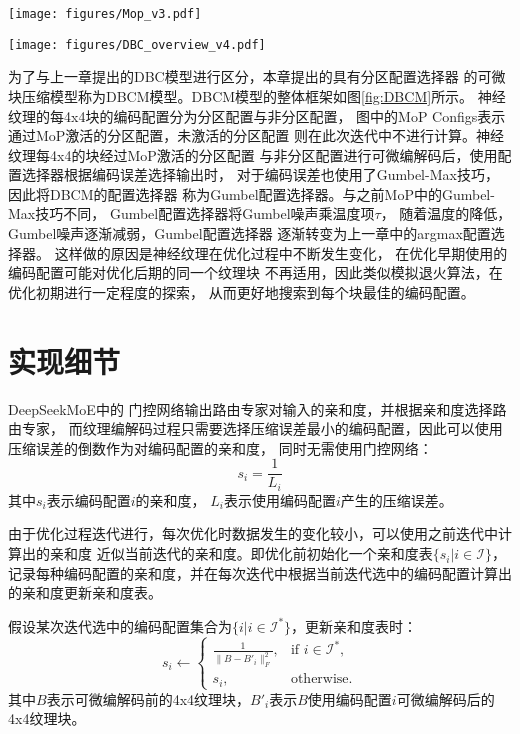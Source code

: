 \begin{figure*}[htbp]
    \centering
    \texttt{[image: figures/Mop\_v3.pdf]}
    \caption{基于混合专家模型的分区配置选择器(MoP)}
    \label{fig:Mop}
\end{figure*}

\begin{figure*}[htbp]
    \centering
    \texttt{[image: figures/DBC\_overview\_v4.pdf]}
    \caption{基于MoP的DBCM模型的整体框架}
    \label{fig:DBCM}
\end{figure*}

为了与上一章提出的DBC模型进行区分，本章提出的具有分区配置选择器
的可微块压缩模型称为DBCM模型。DBCM模型的整体框架如图\ref{fig:DBCM}所示。
神经纹理的每4x4块的编码配置分为分区配置与非分区配置，
图中的MoP Configs表示通过MoP激活的分区配置，未激活的分区配置
则在此次迭代中不进行计算。神经纹理每4x4的块经过MoP激活的分区配置
与非分区配置进行可微编解码后，使用配置选择器根据编码误差选择输出时，
对于编码误差也使用了Gumbel-Max技巧，因此将DBCM的配置选择器
称为Gumbel配置选择器。与之前MoP中的Gumbel-Max技巧不同，
Gumbel配置选择器将Gumbel噪声乘温度项$\tau$，
随着温度的降低，Gumbel噪声逐渐减弱，Gumbel配置选择器
逐渐转变为上一章中的argmax配置选择器。
这样做的原因是神经纹理在优化过程中不断发生变化，
在优化早期使用的编码配置可能对优化后期的同一个纹理块
不再适用，因此类似模拟退火算法，在优化初期进行一定程度的探索，
从而更好地搜索到每个块最佳的编码配置。

\section{实现细节}

DeepSeekMoE\cite{dai2024deepseekmoe}中的
门控网络输出路由专家对输入的亲和度，并根据亲和度选择路由专家，
而纹理编解码过程只需要选择压缩误差最小的编码配置，因此可以使用压缩误差的倒数作为对编码配置的亲和度，
同时无需使用门控网络：
\begin{equation}
s_i=\frac{1}{L_i}
\end{equation}
其中$s_i$表示编码配置$i$的亲和度，
$L_i$表示使用编码配置$i$产生的压缩误差。

由于优化过程迭代进行，每次优化时数据发生的变化较小，可以使用之前迭代中计算出的亲和度
近似当前迭代的亲和度。即优化前初始化一个亲和度表$\{s_i|i\in\mathcal{I}\}$，
记录每种编码配置的亲和度，并在每次迭代中根据当前迭代选中的编码配置计算出的亲和度更新亲和度表。

假设某次迭代选中的编码配置集合为$\{i|i\in\mathcal{I}^*\}$，更新亲和度表时：
\begin{equation}
    s_i\leftarrow
    \begin{cases} 
    \frac{1}{\|B-B'_i\|_F^2}, & \text{if } i\in\mathcal{I}^*,\\
    s_i, & \text{otherwise}.
    \end{cases}
\end{equation}
其中$B$表示可微编解码前的4x4纹理块，$B'_i$表示$B$使用编码配置$i$可微编解码后的4x4纹理块。

